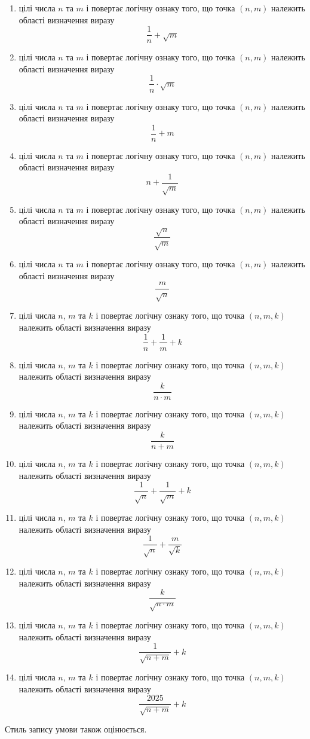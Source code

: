 \documentclass[12pt,a4paper]{article}
\begin{document}
\begin{enumerate}
    \item цілі числа $n$ та $m$ і повертає логічну ознаку того, що точка $(n, m)$ належить області визначення виразу $$\frac{1}{n} + \sqrt{m}$$
    \item цілі числа $n$ та $m$ і повертає логічну ознаку того, що точка $(n, m)$ належить області визначення виразу $$\frac{1}{n} \cdot \sqrt{m}$$
    \item цілі числа $n$ та $m$ і повертає логічну ознаку того, що точка $(n, m)$ належить області визначення виразу $$\frac{1}{n} + m$$
    \item цілі числа $n$ та $m$ і повертає логічну ознаку того, що точка $(n, m)$ належить області визначення виразу $$n + \frac{1}{\sqrt{m}}$$
    \item цілі числа $n$ та $m$ і повертає логічну ознаку того, що точка $(n, m)$ належить області визначення виразу $$\frac{\sqrt{n}}{\sqrt{m}}$$
    \item цілі числа $n$ та $m$ і повертає логічну ознаку того, що точка $(n, m)$ належить області визначення виразу $$\frac{m}{\sqrt{n}}$$
    
    \item цілі числа $n$, $m$ та $k$ і повертає логічну ознаку того, що точка $(n, m, k)$ належить області визначення виразу $$\frac{1}{n} + \frac{1}{m} + k$$
    \item цілі числа $n$, $m$ та $k$ і повертає логічну ознаку того, що точка $(n, m, k)$ належить області визначення виразу $$\frac{k}{n \cdot m}$$
    \item цілі числа $n$, $m$ та $k$ і повертає логічну ознаку того, що точка $(n, m, k)$ належить області визначення виразу $$\frac{k}{n + m}$$
    \item цілі числа $n$, $m$ та $k$ і повертає логічну ознаку того, що точка $(n, m, k)$ належить області визначення виразу $$\frac{1}{\sqrt{n}} + \frac{1}{\sqrt{m}} + k$$
    \item цілі числа $n$, $m$ та $k$ і повертає логічну ознаку того, що точка $(n, m, k)$ належить області визначення виразу $$\frac{1}{\sqrt{n}} + \frac{m}{\sqrt{k}}$$
    \item цілі числа $n$, $m$ та $k$ і повертає логічну ознаку того, що точка $(n, m, k)$ належить області визначення виразу $$\frac{k}{\sqrt{n \cdot m}}$$
    \item цілі числа $n$, $m$ та $k$ і повертає логічну ознаку того, що точка $(n, m, k)$ належить області визначення виразу $$\frac{1}{\sqrt{n + m}} + k$$
    \item цілі числа $n$, $m$ та $k$ і повертає логічну ознаку того, що точка $(n, m, k)$ належить області визначення виразу $$\frac{2025}{\sqrt{n + m}} + k$$
\end{enumerate}

Стиль запису умови також оцінюється.
\end{document}
